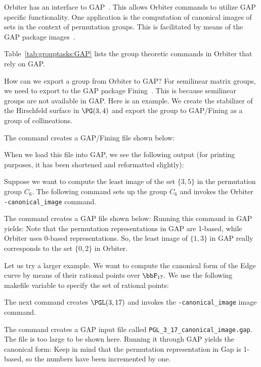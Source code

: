 Orbiter has an interface to GAP~\cite{GAP}. 
This allows Orbiter commands to utilize GAP specific functionality. 
One application is the computation of canonical images 
of sets in the context of permutation groups. 
This is facilitated by means of the GAP package images~\cite{images}.

\bigskip


Table~\ref{tab:grouptasks:GAP} 
lists the group theoretic commands in Orbiter 
that rely on GAP.

\bigskip


How can we export a group from Orbiter to GAP? 
For semilinear matrix groups, 
we need to export to the GAP package Fining~\cite{fining}. 
This is because semilinear groups are not available in GAP.
Here is an example. 
We create the stabilizer of the Hirschfeld surface 
in $\PG(3,4)$ and export the group to GAP/Fining 
as a group of collineations.


The command creates a GAP/Fining file shown below:

When we load this file into GAP, we see the following output
(for printing purposes, 
it has been shortened and reformatted slightly):

\bigskip



Suppose we want to compute the least image 
of the set $\{3,5\}$ in the permutation group 
$C_6.$
The following command sets up the group 
$C_6$ and invokes the Orbiter \verb'-canonical_image' command.


The command creates a GAP file shown below:
Running this command in GAP yields:
Note that the permutation representations in GAP are 1-based, 
while Orbiter uses 0-based representations. 
So, the least image of $\{1,3\}$ 
in GAP really corresponds to the set $\{0,2\}$ in Orbiter.


\bigskip


Let us try a larger example. 
We want to compute the canonical form of the 
Edge curve by means of their rational points over $\bbF_{17}.$
We use the following makefile variable 
to specify the set of rational points:


The next command creates $\PGL(3,17)$ 
and invokes the \verb'-canonical_image' image command.


The command creates a GAP input file called \verb'PGL_3_17_canonical_image.gap'. 
The file is too large to be shown here.
Running it through GAP yields the canonical form:
Keep in mind that the permutation representation in Gap is 1-based, 
so the numbers have been incremented by one.
